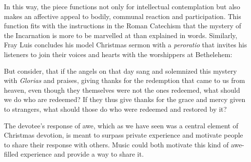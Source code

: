 In this way, the piece functions not only for intellectual contemplation but
also makes an affective appeal to bodily, communal reaction and participation.
This function fits with the instructions in the Roman Catechism that the mystery
of the Incarnation is more to be marvelled at than explained in words.
Similarly, Fray Luis concludes his model Christmas sermon with a
\emph{peroratio} that invites his listeners to join their voices and hearts with
the worshippers at Bethelehem:
\begin{quoting}
    But consider, that if the angels on that day sang and solemnized this
    mystery with \emph{Glorias} and praises, giving thanks 
    for the redemption that came to us from heaven, even though they themselves
    were not the ones redeemed, what should we do who are redeemed?
    If they thus give thanks for the grace  and mercy given
    to strangers, what should those do who were redeemed and restored by it?%
    \Autocite
    [41: ]
    {LuisdeGranada:Xmas}
\end{quoting}
The devotee's response of awe, which as we have seen was a central element of
Christmas devotion, is meant to surpass private experience and motivate people
to share their response with others.
Music could both motivate this kind of awe-filled experience and provide a way
to share it.

